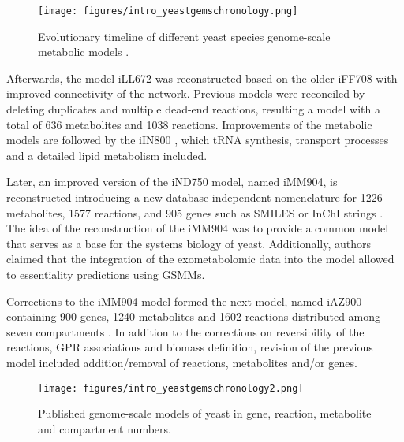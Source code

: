 \vspace{0.6cm}
\begin{figure}[H]
\begin{center}
\texttt{[image: figures/intro\_yeastgemschronology.png]}
\caption[Evolutionary timeline of different yeast species genome-scale metabolic models]{Evolutionary timeline of different yeast species genome-scale metabolic models \cite{lopes2017genome}.}
\label{fig:intro_yeastgemschronology}
\end{center}
\end{figure}

\vspace{-0.8cm}

Afterwards, the model iLL672 was reconstructed based on the older iFF708 with improved connectivity of the network\cite{kuepfer2005metabolic}. Previous models were reconciled by deleting duplicates and multiple dead-end reactions, resulting a model with a total of 636 metabolites and 1038 reactions. Improvements of the metabolic models are followed by the iIN800 \cite{nookaew2008genome}, which tRNA synthesis, transport processes and a detailed lipid metabolism included.

Later, an improved version of the iND750 model, named iMM904, is reconstructed introducing a new database-independent nomenclature for 1226 metabolites, 1577 reactions, and 905 genes such as SMILES or InChI strings \cite{mo2009connecting}. The idea of the reconstruction of the iMM904 was to provide a common model that serves as a base for the systems biology of yeast. Additionally, authors claimed that the  integration of the exometabolomic data into the model allowed to essentiality predictions using GSMMs.

Corrections to the iMM904 model formed the next model, named iAZ900 containing 900 genes, 1240 metabolites and 1602 reactions distributed among seven compartments \cite{zomorrodi2010improving}. In addition to the corrections on reversibility of the reactions, GPR associations and biomass definition, revision of the previous model included addition/removal of reactions, metabolites and/or genes.
\vspace{0.5cm}
\begin{figure}[H]
\texttt{[image: figures/intro\_yeastgemschronology2.png]}
\caption[Published genome-scale models of yeast in gene, reaction, metabolite and compartment numbers]{Published genome-scale models of yeast in gene, reaction, metabolite and compartment numbers\cite{lopes2017genome}.}
\label{fig:intro_yeastgemschronology2}
\end{figure}

